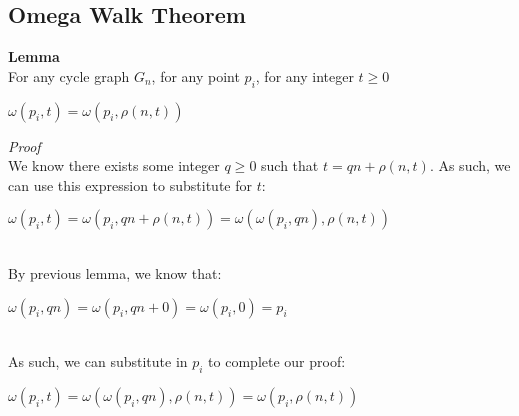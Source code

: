 \documentclass[a4paper,12pt]{article}
\begin{document}
\subsection{Omega Walk Theorem}

\begin{tcolorbox}
\textbf{Lemma}\\
For any cycle graph $G_n$, for any point $p_i$, for any integer $t \geq 0$
\begin{center}
$\omega(p_i, t) = \omega(p_i, \rho(n, t))$
\end{center}
\end{tcolorbox}
\noindent
\textit{Proof}\\
We know there exists some integer $q \geq 0$ such that $t = qn + \rho(n,t)$. As such, we can use this expression to substitute for $t$:
\begin{center}
$\omega(p_i, t) = \omega(p_i, qn + \rho(n, t)) = \omega(\omega(p_i, qn), \rho(n, t))$
\end{center}
\noindent
\\
By previous lemma, we know that:
\begin{center}
$\omega(p_i, qn) = \omega(p_i, qn + 0) = \omega(p_i, 0) = p_i$
\end{center}
\noindent
\\
As such, we can substitute in $p_i$ to complete our proof:
\begin{center}
$\omega(p_i, t) = \omega(\omega(p_i, qn), \rho(n, t)) = \omega(p_i, \rho(n, t))$
\end{center}
\end{document}
